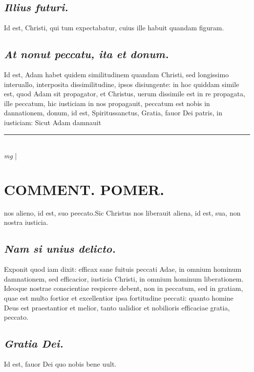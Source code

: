 \documentclass{article}
\begin{document}
\begin{pages}
\subsection*{\textit{Illius futuri. }}\pstart Id est, Christi, qui tum expectabatur, cuius ille habuit quandam figuram.   \pend
{}
{}
\subsection*{\textit{At nonut peccatu, ita et donum. }}\pstart Id est, Adam habet quidem similitudinem quandam Christi, sed longissimo interuallo, interposita dissimilitudine, ipsos disiungente: in hoc quiddam simile est, quod Adam sit propagator, et Christus, uerum dissimile est in re propagata, ille peccatum, hic iusticiam in nos propagauit, peccatum est nobis in dannationem, donum, id est, Spiritussanctus, Gratia, fauor Dei patris, in iusticiam: Sicut Adam damnauit  \pend
\vspace{0.5cm}\noindent
\vspace{0.2cm}\rule{1cm}{0.2pt}\\ 
\hspace{0.2cm}\textit{mg}
\footnotesize 
\normalsize| 
\section*{COMMENT. POMER.  }\pstart nos alieno, id est, suo peecato.Sic Christus nos liberauit aliena, id est, sua, non nostra iusticia.   \pend
{}
{}
\subsection*{\textit{Nam si unius delicto. }}\pstart Exponit quod iam dixit: efficax sane fuituis peccati Adae, in omnium hominum damnationem, sed efficacior, iusticia Christi, in omnium hominum liberationem. Ideoque nostrae conscientiae respicere debent, non in peccatum, sed in gratiam, quae est multo fortior et excellentior ipsa fortitudine peccati: quanto homine Deus est praestantior et melior, tanto ualidior et nobilioris efficaciae gratia, peccato.   \pend
{}
{}
\subsection*{\textit{Gratia Dei. }}\pstart Id est, fauor Dei quo nobis bene uult.   \pend
{}
{}

\end{pages}
\end{document}
